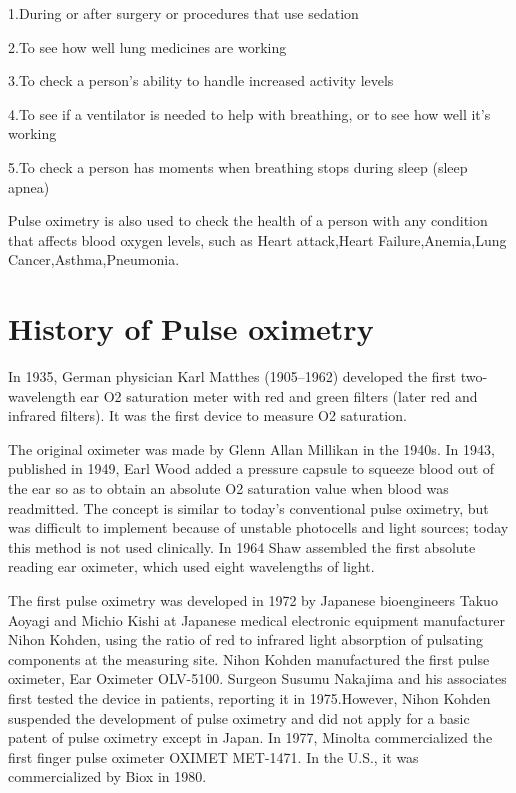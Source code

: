 \documentclass[12pt]{article}
\begin{document}
1.During or after surgery or procedures that use sedation

2.To see how well lung medicines are working

3.To check a person’s ability to handle increased activity levels

4.To see if a ventilator is needed to help with breathing, or to see how well it’s working

5.To check a person has moments when breathing stops during sleep (sleep apnea)

Pulse oximetry is also used to check the health of a person with any condition that affects blood oxygen levels, such as Heart attack,Heart Failure,Anemia,Lung Cancer,Asthma,Pneumonia.

\section{History of Pulse oximetry}
In 1935, German physician Karl Matthes (1905–1962) developed the first two-wavelength ear O2 saturation meter with red and green filters (later red and infrared filters). It was the first device to measure O2 saturation.

The original oximeter was made by Glenn Allan Millikan in the 1940s. In 1943, published in 1949, Earl Wood added a pressure capsule to squeeze blood out of the ear so as to obtain an absolute O2 saturation value when blood was readmitted. The concept is similar to today's conventional pulse oximetry, but was difficult to implement because of unstable photocells and light sources; today this method is not used clinically. In 1964 Shaw assembled the first absolute reading ear oximeter, which used eight wavelengths of light.

The first pulse oximetry was developed in 1972 by Japanese bioengineers Takuo Aoyagi and Michio Kishi at Japanese medical electronic equipment manufacturer Nihon Kohden, using the ratio of red to infrared light absorption of pulsating components at the measuring site. Nihon Kohden manufactured the first pulse oximeter, Ear Oximeter OLV-5100. Surgeon Susumu Nakajima and his associates first tested the device in patients, reporting it in 1975.However, Nihon Kohden suspended the development of pulse oximetry and did not apply for a basic patent of pulse oximetry except in Japan. In 1977, Minolta commercialized the first finger pulse oximeter OXIMET MET-1471. In the U.S., it was commercialized by Biox in 1980.
\end{document}
